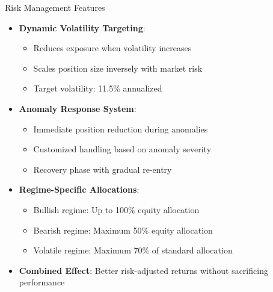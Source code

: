 \documentclass[aspectratio=169,xcolor=dvipsnames]{beamer}
\begin{document}
\begin{frame}{Risk Management Features}
    \begin{itemize}
        \item \textbf{Dynamic Volatility Targeting}:
              \begin{itemize}
                  \item Reduces exposure when volatility increases
                  \item Scales position size inversely with market risk
                  \item Target volatility: 11.5\% annualized
              \end{itemize}
        \item \textbf{Anomaly Response System}:
              \begin{itemize}
                  \item Immediate position reduction during anomalies
                  \item Customized handling based on anomaly severity
                  \item Recovery phase with gradual re-entry
              \end{itemize}
        \item \textbf{Regime-Specific Allocations}:
              \begin{itemize}
                  \item Bullish regime: Up to 100\% equity allocation
                  \item Bearish regime: Maximum 50\% equity allocation
                  \item Volatile regime: Maximum 70\% of standard allocation
              \end{itemize}
        \item \textbf{Combined Effect}: Better risk-adjusted returns without sacrificing performance
    \end{itemize}
\end{frame}
\end{document}
